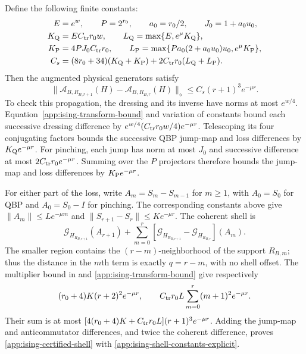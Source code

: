 Define the following finite constants:
\begin{align}
 E&=e^w,\qquad P=2^{r_0},\qquad a_0=r_0/2,\qquad J_0=1+a_0u_0,\notag\\
 K_{\rm Q}&=E C_{\rm tr}r_0w,\qquad
 L_{\rm Q}=\max\{E,e^\mu K_{\rm Q}\},\notag\\
 K_{\rm P}&=4PJ_0C_{\rm tr}r_0,\qquad
 L_{\rm P}=\max\{Pa_0(2+a_0u_0)u_0,e^\mu K_{\rm P}\},\notag\\
 C_s&=(8r_0+34)(K_{\rm Q}+K_{\rm P})
       +2C_{\rm tr}r_0(L_{\rm Q}+L_{\rm P}).
 \label{app:ising-shell-constants-explicit}
\end{align}
Then the augmented physical generators satisfy
\begin{equation}
 \|\mathcal A_{B,R_{B,r+1}}(H)-\mathcal A_{B,R_{B,r}}(H)\|_\diamond
 \le C_s(r+1)^3e^{-\mu r}.
 \label{app:ising-certified-shell}
\end{equation}
To check this propagation, the dressing and its inverse have norms at
most $e^{w/4}$. Equation~\eqref{app:ising-transform-bound} and variation
of constants bound each successive dressing difference by
$e^{w/4}(C_{\rm tr}r_0w/4)e^{-\mu r}$.
Telescoping its four conjugating factors bounds the successive QBP
jump-map and loss differences by $K_{\rm Q}e^{-\mu r}$.
For pinching, each jump has norm at most $J_0$ and successive difference
at most $2C_{\rm tr}r_0e^{-\mu r}$. Summing over the $P$ projectors
therefore bounds the jump-map and loss differences by
$K_{\rm P}e^{-\mu r}$.

For either part of the loss, write $A_m=S_m-S_{m-1}$ for $m\ge1$,
with $A_0=S_0$ for QBP and $A_0=S_0-I$ for pinching.
The corresponding constants above give
$\|A_m\|\le L e^{-\mu m}$ and
$\|S_{r+1}-S_r\|\le K e^{-\mu r}$.
The coherent shell is
\[
 \mathcal G_{H_{R_{B,r+1}}}(A_{r+1})
 +\sum_{m=0}^r
 [\mathcal G_{H_{R_{B,r+1}}}-\mathcal G_{H_{R_{B,r}}}](A_m).
\]
The smaller region contains the $(r-m)$-neighborhood of the support
$R_{B,m}$; thus the distance in the $m$th term is exactly $q=r-m$,
with no shell offset. The multiplier bound in 
and \eqref{app:ising-transform-bound} give respectively
\[
 (r_0+4)K(r+2)^2e^{-\mu r},\qquad
 C_{\rm tr}r_0L\sum_{m=0}^r(m+1)^2e^{-\mu r}.
\]
Their sum is at most
$[4(r_0+4)K+C_{\rm tr}r_0L](r+1)^3e^{-\mu r}$.
Adding the jump-map and anticommutator differences, and twice the
coherent difference, proves \eqref{app:ising-certified-shell} with
\eqref{app:ising-shell-constants-explicit}.

